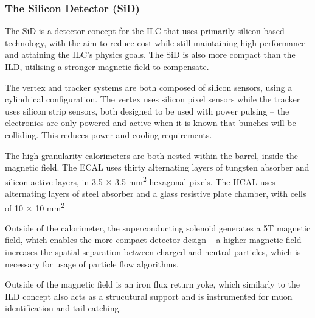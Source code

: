 \subsubsection{The Silicon Detector (SiD)}
The \acrfull{SiD} is a detector concept for the \acrshort{ILC} that uses primarily silicon-based technology, with the aim to reduce cost while still maintaining high performance and attaining the \acrshort{ILC}'s physics goals. The \acrshort{SiD} is also more compact than the \acrshort{ILD}, utilising a stronger magnetic field to compensate.

The vertex and tracker systems are both composed of silicon sensors, using a cylindrical configuration. The vertex uses silicon pixel sensors while the tracker uses silicon strip sensors, both designed to be used with power pulsing -- the electronics are only powered and active when it is known that bunches will be colliding. This reduces power and cooling requirements. 

The high-granularity calorimeters are both nested within the barrel, inside the magnetic field. The \acrshort{ECAL} uses thirty alternating layers of tungsten absorber and silicon active layers, in 3.5 $\times$ 3.5 mm\textsuperscript{2} hexagonal pixels. The \acrshort{HCAL} uses alternating layers of steel absorber and a glass resistive plate chamber, with cells of 10 $\times$ 10 mm\textsuperscript{2}

Outside of the calorimeter, the superconducting solenoid generates a 5T magnetic field, which enables the more compact detector design -- a higher magnetic field increases the spatial separation between charged and neutral particles, which is necessary for usage of particle flow algorithms.

Outside of the magnetic field is an iron flux return yoke, which similarly to the \acrshort{ILD} concept also acts as a strucutural support and is instrumented for muon identification and tail catching. 

